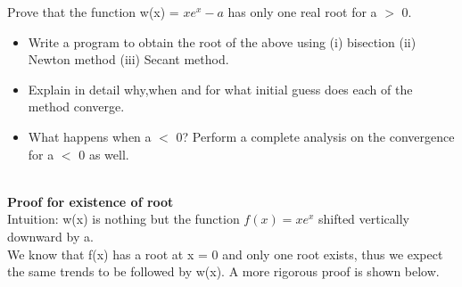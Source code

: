 \documentclass[letterpaper]{exam}
\begin{document}
\begin{questions}
Prove that the function w(x) = $xe^x - a$ has only one real root for a $>$ 0.
\begin{itemize}
    \item Write a program to obtain the root of the above using (i) bisection (ii) Newton method (iii) Secant method.
    \item Explain in detail why,when and for what initial guess does each of the method converge.
    \item What happens when a $<$ 0? Perform a complete analysis on the convergence for a $<$ 0 as well.
\end{itemize}
\begin{solution}\\
\textbf{Proof for existence of root}\\
Intuition: w(x) is nothing but the function $f(x) = xe^x$ shifted vertically downward by a.\\
We know that f(x) has a root at x = 0 and only one root exists, thus we expect the same trends to be followed by w(x). A more rigorous proof is shown below.\\


\end{solution}
\end{questions}
\end{document}
